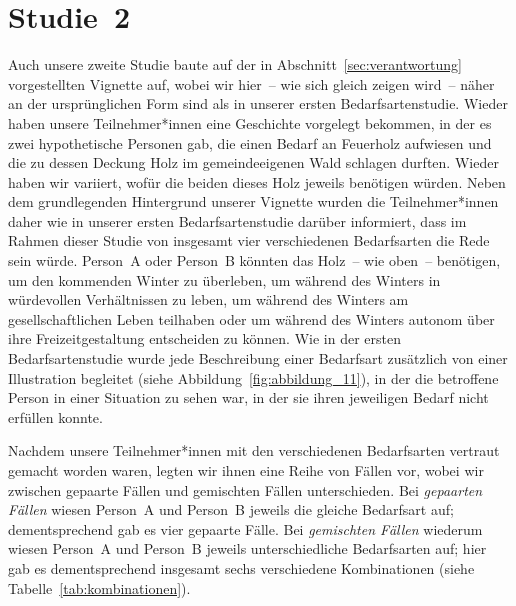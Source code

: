 \documentclass[justified,nobib,nohyper,symmetric,twoside]{tufte-book}
\begin{document}
\section{Studie~2}\label{sec:bedarfsarten_2}
Auch unsere zweite Studie baute auf der in Abschnitt~\ref{sec:verantwortung} vorgestellten Vignette auf, wobei wir hier~-- wie sich gleich zeigen wird~-- näher an der ursprünglichen Form sind als in unserer ersten Bedarfsartenstudie.
Wieder haben unsere Teilnehmer*innen eine Geschichte vorgelegt bekommen, in der es zwei hypothetische Personen gab, die einen Bedarf an Feuerholz aufwiesen und die zu dessen Deckung Holz im gemeindeeigenen Wald schlagen durften.
Wieder haben wir variiert, wofür die beiden dieses Holz jeweils benötigen würden.
Neben dem grundlegenden Hintergrund unserer Vignette wurden die Teilnehmer*innen daher wie in unserer ersten Bedarfsartenstudie darüber informiert, dass im Rahmen dieser Studie von insgesamt vier verschiedenen Bedarfsarten die Rede sein würde.
Person~A oder Person~B könnten das Holz~-- wie oben~-- benötigen, um den kommenden Winter zu überleben, um während des Winters in würdevollen Verhältnissen zu leben, um während des Winters am gesellschaftlichen Leben teilhaben oder um während des Winters autonom über ihre Freizeitgestaltung entscheiden zu können.
Wie in der ersten Bedarfsartenstudie wurde jede Beschreibung einer Bedarfsart zusätzlich von einer Illustration begleitet (siehe Abbildung~\ref{fig:abbildung_11}), in der die betroffene Person in einer Situation zu sehen war, in der sie ihren jeweiligen Bedarf nicht erfüllen konnte.

Nachdem unsere Teilnehmer*innen mit den verschiedenen Bedarfsarten vertraut gemacht worden waren, legten wir ihnen eine Reihe von Fällen vor, wobei wir zwischen gepaarte Fällen und gemischten Fällen unterschieden.
Bei \textit{gepaarten Fällen} wiesen Person~A und Person~B jeweils die gleiche Bedarfsart auf; dementsprechend gab es vier gepaarte Fälle.
Bei \textit{gemischten Fällen} wiederum wiesen Person~A und Person~B jeweils unterschiedliche Bedarfsarten auf; hier gab es dementsprechend insgesamt sechs verschiedene Kombinationen (siehe Tabelle~\ref{tab:kombinationen}).
\end{document}
